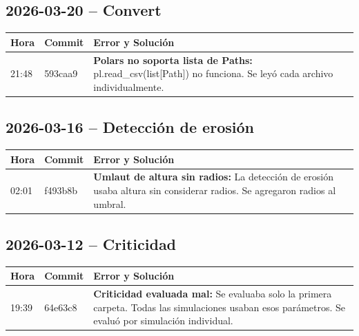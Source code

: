 \documentclass[12pt,a4paper]{article}
\begin{document}
\subsection*{2026-03-20 -- Convert}

\begin{table}[H]
	\centering
	\begin{tabular}{@{}llp{9cm}@{}}
		\toprule
		\textbf{Hora} & \textbf{Commit} & \textbf{Error y Solución}                                                                                              \\
		\midrule
		21:48         & 593caa9         & \textbf{Polars no soporta lista de Paths:} pl.read\_csv(list[Path]) no funciona. Se leyó cada archivo individualmente. \\
		\bottomrule
	\end{tabular}
\end{table}

\subsection*{2026-03-16 -- Detección de erosión}

\begin{table}[H]
	\centering
	\begin{tabular}{@{}llp{9cm}@{}}
		\toprule
		\textbf{Hora} & \textbf{Commit} & \textbf{Error y Solución}                                                                                                        \\
		\midrule
		02:01         & f493b8b         & \textbf{Umlaut de altura sin radios:} La detección de erosión usaba altura sin considerar radios. Se agregaron radios al umbral. \\
		\bottomrule
	\end{tabular}
\end{table}

\subsection*{2026-03-12 -- Criticidad}

\begin{table}[H]
	\centering
	\begin{tabular}{@{}llp{9cm}@{}}
		\toprule
		\textbf{Hora} & \textbf{Commit} & \textbf{Error y Solución}                                                                                                                                  \\
		\midrule
		19:39         & 64e63c8         & \textbf{Criticidad evaluada mal:} Se evaluaba solo la primera carpeta. Todas las simulaciones usaban esos parámetros. Se evaluó por simulación individual. \\
		\bottomrule
	\end{tabular}
\end{table}
\end{document}
